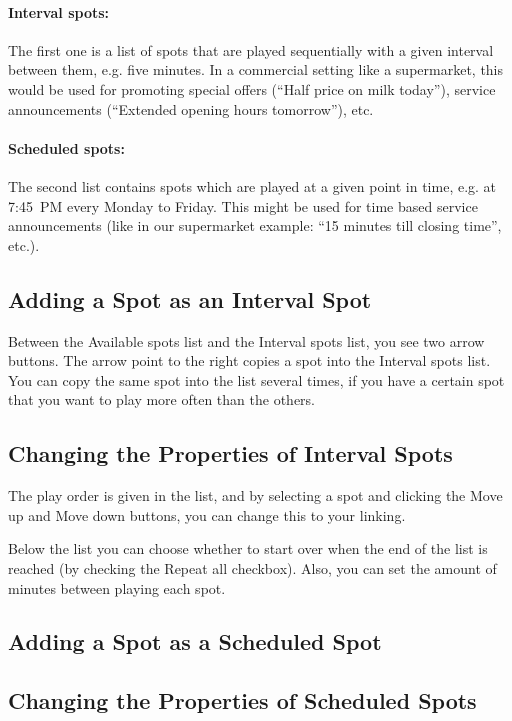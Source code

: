 \documentclass[a4paper,12pt]{report}
\begin{document}
\paragraph{Interval spots:} The first one is a list of spots that are played
sequentially with a given interval between them, e.g. five minutes. In a
commercial setting like a supermarket, this would be used for promoting special
offers (``Half price on milk today''), service announcements (``Extended opening
hours tomorrow''), etc.

\paragraph{Scheduled spots:} The second list contains spots which are played at
a given point in time, e.g. at 7:45~PM every Monday to Friday. This might be
used for time based service announcements (like in our supermarket example: ``15
minutes till closing time'', etc.).

\subsection{Adding a Spot as an Interval Spot}
Between the Available spots list and the Interval spots list, you see two arrow
buttons. The arrow point to the right copies a spot into the Interval spots
list. You can copy the same spot into the list several times, if you have a
certain spot that you want to play more often than the others.

\subsection{Changing the Properties of Interval Spots}
The play order is given in the list, and by selecting a spot and clicking the
Move up and Move down buttons, you can change this to your linking.

Below the list you can choose whether to start over when the end of the list is
reached (by checking the Repeat all checkbox). Also, you can set the amount of
minutes between playing each spot.

\subsection{Adding a Spot as a Scheduled Spot}

\subsection{Changing the Properties of Scheduled Spots}
\end{document}

